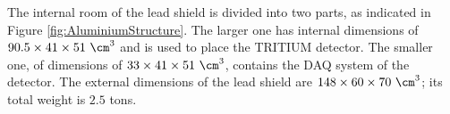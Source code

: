 The internal room of the lead shield is divided into two parts, as indicated in Figure \ref{fig:AluminiumStructure}. The larger one has internal dimensions of $90.5 \times 41 \times 51~\cm^3$ and is used to place the TRITIUM detector. The smaller one, of dimensions of $33 \times 41 \times 51~\cm^3$, contains the DAQ system of the detector. The external dimensions of the lead shield are $148 \times 60 \times 70~\cm^3$; its total weight is $2.5$ tons.